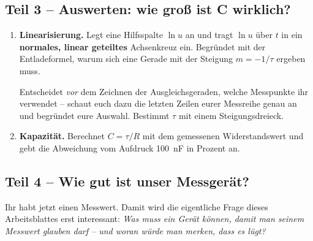 \documentclass[a4paper,12pt]{scrartcl}
\begin{document}
\subsection*{Teil 3 -- Auswerten: wie groß ist C wirklich?}

\begin{enumerate}[leftmargin=2em, resume, itemsep=13pt, topsep=9pt]
\item \textbf{Linearisierung.} Legt eine Hilfsspalte $\ln u$ an und tragt $\ln u$ über $t$ in ein
\textbf{normales, linear geteiltes} Achsenkreuz ein. Begründet mit der Entladeformel, warum sich
eine Gerade mit der Steigung $m=-1/\tau$ ergeben muss.

\smallskip
Entscheidet \emph{vor} dem Zeichnen der Ausgleichsgeraden, welche Messpunkte ihr verwendet --
schaut euch dazu die letzten Zeilen eurer Messreihe genau an und begründet eure Auswahl.
Bestimmt $\tau$ mit einem Steigungsdreieck.

\item \textbf{Kapazität.} Berechnet $C=\tau/R$ mit dem gemessenen Widerstandswert und gebt die
Abweichung vom Aufdruck \SI{100}{\nano\farad} in Prozent an.
\end{enumerate}

\subsection*{Teil 4 -- Wie gut ist unser Messgerät?}

\noindent Ihr habt jetzt einen Messwert. Damit wird die eigentliche Frage dieses Arbeitsblattes
erst interessant: \emph{Was muss ein Gerät können, damit man seinem Messwert glauben darf -- und
woran würde man merken, dass es lügt?}
\end{document}
